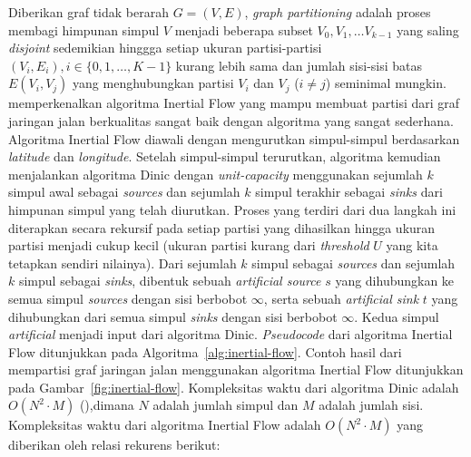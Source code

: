 Diberikan graf tidak berarah $G=(V,E)$, \textit{graph partitioning} adalah proses membagi himpunan simpul $V$ menjadi beberapa subset $V_0,V_1,\ldots V_{k-1}$ yang saling \textit{disjoint} sedemikian hinggga setiap ukuran partisi-partisi $(V_i,E_i),i\in\{0,1,\ldots, K-1\}$ kurang lebih sama dan jumlah sisi-sisi batas $E(V_i,V_j)$ yang menghubungkan partisi $V_i$ dan $V_j$ ($i\neq j$) seminimal mungkin. \cite{Schild2015} memperkenalkan algoritma Inertial Flow yang mampu membuat partisi dari graf jaringan jalan berkualitas sangat baik dengan algoritma yang sangat sederhana. Algoritma Inertial Flow diawali dengan mengurutkan simpul-simpul berdasarkan \textit{latitude} dan \textit{longitude}. Setelah simpul-simpul terurutkan, algoritma kemudian menjalankan algoritma Dinic dengan \textit{unit-capacity} \cite{Dinitz2006} menggunakan sejumlah $k$ simpul awal sebagai \textit{sources} dan sejumlah $k$ simpul terakhir sebagai \textit{sinks} dari himpunan simpul yang telah diurutkan. Proses yang terdiri dari dua langkah ini diterapkan secara rekursif pada setiap partisi yang dihasilkan hingga ukuran partisi menjadi cukup kecil (ukuran partisi kurang dari \textit{threshold} $U$ yang kita tetapkan sendiri nilainya). Dari sejumlah $k$ simpul sebagai \textit{sources} dan sejumlah $k$ simpul sebagai \textit{sinks}, dibentuk sebuah \textit{artificial source} $s$ yang dihubungkan ke semua simpul \textit{sources} dengan sisi berbobot $\infty$, serta sebuah \textit{artificial sink} $t$ yang dihubungkan dari semua simpul \textit{sinks} dengan sisi berbobot $\infty$. Kedua simpul \textit{artificial} menjadi input dari algoritma Dinic. \textit{Pseudocode} dari algoritma Inertial Flow ditunjukkan pada Algoritma~\ref{alg:inertial-flow}. Contoh hasil dari mempartisi graf jaringan jalan menggunakan algoritma Inertial Flow ditunjukkan pada Gambar~\ref{fig:inertial-flow}. Kompleksitas waktu dari algoritma Dinic adalah $O(N^2\cdot M)$ (\cite{Dinitz2006}),dimana $N$ adalah jumlah simpul dan $M$ adalah jumlah sisi. Kompleksitas waktu dari algoritma Inertial Flow adalah $O(N^2\cdot M)$ yang diberikan oleh relasi rekurens berikut:

